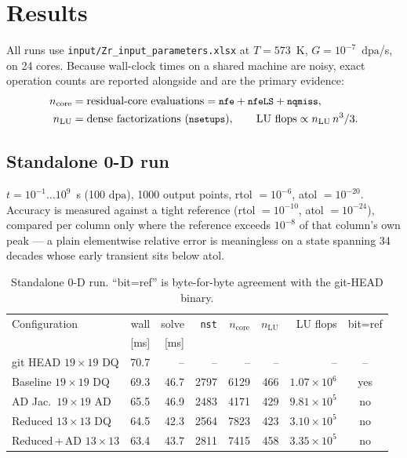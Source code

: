 \documentclass[11pt,a4paper]{article}
\newcommand{\code}[1]{\texttt{\small #1}}
\newcommand{\dpa}{\ensuremath{\mathrm{dpa}}}
\begin{document}
\section{Results}
\label{sec:results}

All runs use \code{input/Zr\_input\_parameters.xlsx} at $T=573$~K,
$G=10^{-7}$~\dpa/s, on 24 cores. Because wall-clock times on a shared machine
are noisy, exact operation counts are reported alongside and are the primary
evidence:
\begin{align*}
n_{\mathrm{core}} &= \text{residual-core evaluations} =
  \code{nfe} + \code{nfeLS} + \code{nqmiss},\\
n_{\mathrm{LU}}   &= \text{dense factorizations (\code{nsetups})}, \qquad
\text{LU flops} \propto n_{\mathrm{LU}}\,n^{3}/3 .
\end{align*}

\subsection{Standalone 0-D run}

$t=10^{-1}\ldots10^{9}$~s (100 \dpa), 1000 output points, rtol $=10^{-6}$,
atol $=10^{-20}$. Accuracy is measured against a tight reference
(rtol $=10^{-10}$, atol $=10^{-24}$), compared per column only where the
reference exceeds $10^{-8}$ of that column's own peak --- a plain elementwise
relative error is meaningless on a state spanning 34 decades whose early
transient sits below atol.

\begin{table}[htb]
\centering
\caption{Standalone 0-D run. ``bit=ref'' is byte-for-byte agreement with the
git-HEAD binary.}
\label{tab:phaseA}
\begin{tabular}{lrrrrrrc}
\toprule
Configuration & wall & solve & \code{nst} & $n_{\mathrm{core}}$
              & $n_{\mathrm{LU}}$ & LU flops & bit=ref \\
              & [ms] & [ms] & & & & & \\
\midrule
git HEAD $19\times19$ DQ  & 70.7 & --   & --   & --   & --  & --                  & --  \\
Baseline $19\times19$ DQ  & 69.3 & 46.7 & 2797 & 6129 & 466 & $1.07\times10^{6}$  & yes \\
AD Jac.\ $19\times19$ AD  & 65.5 & 46.9 & 2483 & 4171 & 429 & $9.81\times10^{5}$  & no  \\
Reduced $13\times13$ DQ   & 64.5 & 42.3 & 2564 & 7823 & 423 & $3.10\times10^{5}$  & no  \\
Reduced\,+\,AD $13\times13$ & 63.4 & 43.7 & 2811 & 7415 & 458 & $3.35\times10^{5}$ & no \\
\bottomrule
\end{tabular}
\end{table}
\end{document}
